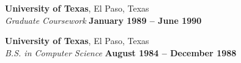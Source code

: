\documentclass[margin,line]{resume}
\begin{document}
\begin{resume}
    \textbf{\listing University of Texas}, El Paso, Texas \vspace{1mm}\\
    \textsl{Graduate Coursework} \hfill \textbf{January 1989 -- June 1990}\vspace{-3mm}\\\vspace{-1mm}%

    \textbf{\listing University of Texas}, El Paso, Texas \vspace{1mm}\\
    \textsl{B.S. in Computer Science} \hfill \textbf{August 1984 -- December 1988}\vspace{-3mm}\\\vspace{-1mm}%

    \vspace{-1mm}


\end{resume}
\end{document}
